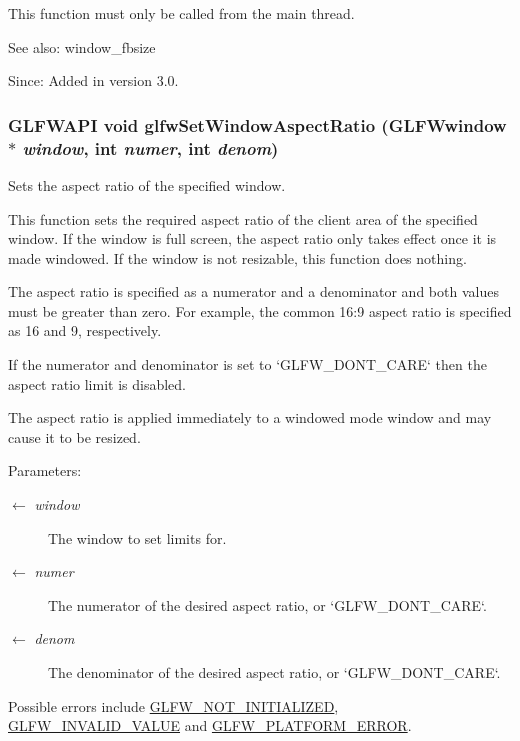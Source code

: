 This function must only be called from the main thread.

\begin{Desc}
\item[See also:]window\_\-fbsize\end{Desc}
\begin{Desc}
\item[Since:]Added in version 3.0. \end{Desc}
\hypertarget{group__window_gd2ae94a2c5ee1c46a36e13a8f4ac68ac}{
\subsubsection[glfwSetWindowAspectRatio]{\setlength{\rightskip}{0pt plus 5cm}GLFWAPI void glfwSetWindowAspectRatio ({\bf GLFWwindow} $\ast$ {\em window}, \/  int {\em numer}, \/  int {\em denom})}}
\label{group__window_gd2ae94a2c5ee1c46a36e13a8f4ac68ac}


Sets the aspect ratio of the specified window. 

This function sets the required aspect ratio of the client area of the specified window. If the window is full screen, the aspect ratio only takes effect once it is made windowed. If the window is not resizable, this function does nothing.

The aspect ratio is specified as a numerator and a denominator and both values must be greater than zero. For example, the common 16:9 aspect ratio is specified as 16 and 9, respectively.

If the numerator and denominator is set to `GLFW\_\-DONT\_\-CARE` then the aspect ratio limit is disabled.

The aspect ratio is applied immediately to a windowed mode window and may cause it to be resized.

\begin{Desc}
\item[Parameters:]
\begin{description}
\item[\mbox{$\leftarrow$} {\em window}]The window to set limits for. \item[\mbox{$\leftarrow$} {\em numer}]The numerator of the desired aspect ratio, or `GLFW\_\-DONT\_\-CARE`. \item[\mbox{$\leftarrow$} {\em denom}]The denominator of the desired aspect ratio, or `GLFW\_\-DONT\_\-CARE`.\end{description}
\end{Desc}
Possible errors include \hyperlink{group__errors_g2374ee02c177f12e1fa76ff3ed15e14a}{GLFW\_\-NOT\_\-INITIALIZED}, \hyperlink{group__errors_gaf2ef9aa8202c2b82ac2d921e554c687}{GLFW\_\-INVALID\_\-VALUE} and \hyperlink{group__errors_gd44162d78100ea5e87cdd38426b8c7a1}{GLFW\_\-PLATFORM\_\-ERROR}.

